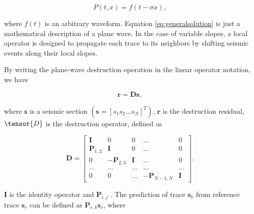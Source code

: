 \begin{equation}
\label{eq:generalsolution}
P\left(t,x\right)=f\left(t-\sigma x\right),
\end{equation}


where $f\left(t\right)$ is an arbitrary waveform. Equation \ref{eq:generalsolution} is just a mathematical description of a plane wave. In the case of variable slopes, a local operator is designed to propagate each trace to its neighbors by shifting seismic events along their local slopes.

By writing the plane-wave destruction operation in the linear operator notation, we have\old{:}

\begin{equation}
\label{eq:pw destruction operation}
\mathbf{r=Ds},
\end{equation}

where\old{,}  $\mathbf{s}$ is a seismic section  $\left(\mathbf{s}=\left[s_1 s_2 \dots s_N\right]^T\right)$, $\mathbf{r}$ is the destruction residual,   $\tensor{D}$ is the destruction operator, defined as

\begin{equation}
\label{eq:destruction operator}
\mathbf{D}=\left[\begin{array}{ccccc}
\mathbf{I} & 0 & 0 & \dots & 0\\
\mathbf{P}_{1,2} & \mathbf{I} & 0 & \dots & 0\\
0 & -\mathbf{P}_{2,3} & \mathbf{I} & \dots & 0\\
\dots & \dots & \dots & \dots & \dots\\
0 & 0 & \dots & -\mathbf{P}_{N-1,N} & \mathbf{I}\end{array}\right].
\end{equation}

$\mathbf{I}$ is the identity operator\new{,} and $\mathbf{P}_{i,j}$ . The prediction of trace $\mathbf{s}_k$ from reference trace $\mathbf{s}_r$ can be defined as $\mathbf{P}_{r,k}\mathbf{s}_r$, where
 
